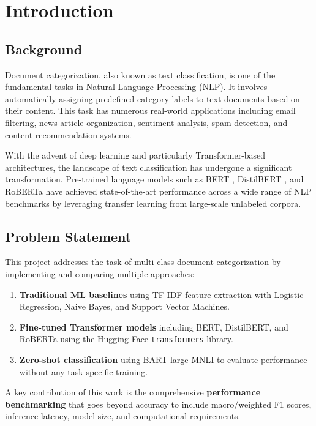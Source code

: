 \documentclass[12pt, a4paper]{article}
\begin{document}
\section{Introduction}

\subsection{Background}
Document categorization, also known as text classification, is one of the fundamental tasks in Natural Language Processing (NLP). It involves automatically assigning predefined category labels to text documents based on their content. This task has numerous real-world applications including email filtering, news article organization, sentiment analysis, spam detection, and content recommendation systems.

With the advent of deep learning and particularly Transformer-based architectures, the landscape of text classification has undergone a significant transformation. Pre-trained language models such as BERT \cite{devlin2019bert}, DistilBERT \cite{sanh2019distilbert}, and RoBERTa \cite{liu2019roberta} have achieved state-of-the-art performance across a wide range of NLP benchmarks by leveraging transfer learning from large-scale unlabeled corpora.

\subsection{Problem Statement}
This project addresses the task of multi-class document categorization by implementing and comparing multiple approaches:
\begin{enumerate}
    \item \textbf{Traditional ML baselines} using TF-IDF feature extraction with Logistic Regression, Naive Bayes, and Support Vector Machines.
    \item \textbf{Fine-tuned Transformer models} including BERT, DistilBERT, and RoBERTa using the Hugging Face \texttt{transformers} library.
    \item \textbf{Zero-shot classification} using BART-large-MNLI to evaluate performance without any task-specific training.
\end{enumerate}

A key contribution of this work is the comprehensive \textbf{performance benchmarking} that goes beyond accuracy to include macro/weighted F1 scores, inference latency, model size, and computational requirements.
\end{document}
